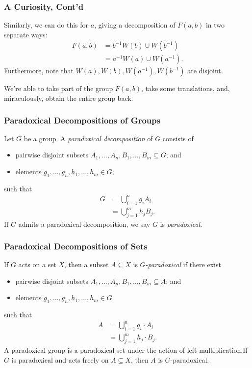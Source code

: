 \documentclass{beamer-custom}
\begin{document}
\begin{frame}
  \frametitle{A Curiosity, Cont'd}
  Similarly, we can do this for $a$, giving a decomposition of $F(a,b)$ in two separate ways:
  \begin{align*}
    F(a,b) &= b^{-1}W(b)\cup W\left( b^{-1} \right)\\
           &= a^{-1}W(a)\cup W\left( a^{-1} \right).
  \end{align*}\pause
  Furthermore, note that $W\left( a \right),W\left( b \right),W\left( a^{-1} \right),W\left( b^{-1} \right)$ are disjoint.\pause\newline

  We're able to take part of the group $F(a,b)$, take some translations, and, miraculously, obtain the entire group back.
\end{frame}
\begin{frame}
  \frametitle{Paradoxical Decompositions of Groups}
  Let $G$ be a group. A \textit{paradoxical decomposition} of $G$ consists of
  \begin{itemize}
    \item pairwise disjoint subsets $A_1,\dots,A_n,B_1,\dots,B_m\subseteq G$; and
    \item elements $g_1,\dots,g_n,h_1,\dots,h_m\in G$;
  \end{itemize}
  such that
  \begin{align*}
    G &= \bigcup_{i=1}^{n}g_iA_i\\
      &= \bigcup_{j=1}^{m}h_jB_j.
  \end{align*}\pause
  If $G$ admits a paradoxical decomposition, we say $G$ is \textit{paradoxical}.
\end{frame}
\begin{frame}
  \frametitle{Paradoxical Decompositions of Sets}
  If $G$ acts on a set $X$, then a subset $A\subseteq X$ is \textit{$G$-paradoxical} if there exist
  \begin{itemize}
    \item pairwise disjoint subsets $A_1,\dots,A_n,B_1,\dots,B_m\subseteq A$; and
    \item elements $g_1,\dots,g_n,h_1,\dots,h_m\in G$
  \end{itemize}
  such that
  \begin{align*}
    A &= \bigcup_{i=1}^{n}g_i\cdot A_i\\
      &= \bigcup_{j=1}^{m}h_j\cdot B_j.
  \end{align*}\pause
  A paradoxical group is a paradoxical set under the action of left-multiplication.\pause\:If $G$ is paradoxical and acts freely on $A\subseteq X$, then $A$ is $G$-paradoxical.
\end{frame}
\end{document}
